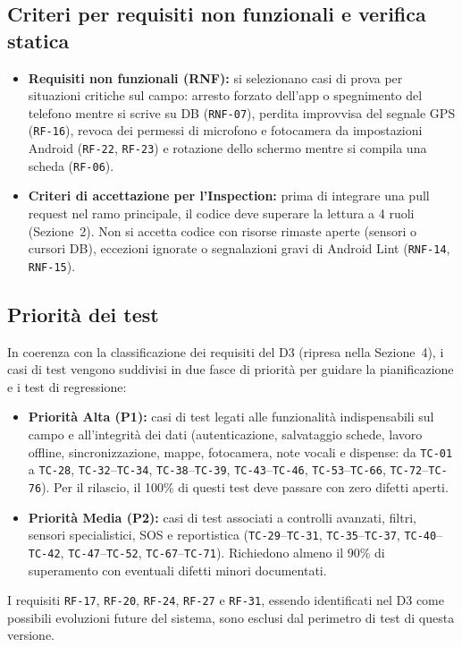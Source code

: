\subsection{Criteri per requisiti non funzionali e verifica statica}
\begin{itemize}
    \item \textbf{Requisiti non funzionali (RNF):} si selezionano casi di prova per situazioni critiche sul campo: arresto forzato dell'app o spegnimento del telefono mentre si scrive su DB (\texttt{RNF-07}), perdita improvvisa del segnale GPS (\texttt{RF-16}), revoca dei permessi di microfono e fotocamera da impostazioni Android (\texttt{RF-22}, \texttt{RF-23}) e rotazione dello schermo mentre si compila una scheda (\texttt{RF-06}).
    \item \textbf{Criteri di accettazione per l'Inspection:} prima di integrare una pull request nel ramo principale, il codice deve superare la lettura a 4 ruoli (Sezione~2). Non si accetta codice con risorse rimaste aperte (sensori o cursori DB), eccezioni ignorate o segnalazioni gravi di Android Lint (\texttt{RNF-14}, \texttt{RNF-15}).
\end{itemize}

\subsection{Priorità dei test}
In coerenza con la classificazione dei requisiti del D3 (ripresa nella Sezione~4), i casi di test vengono suddivisi in due fasce di priorità per guidare la pianificazione e i test di regressione:
\begin{itemize}
    \item \textbf{Priorità Alta (P1):} casi di test legati alle funzionalità indispensabili sul campo e all'integrità dei dati (autenticazione, salvataggio schede, lavoro offline, sincronizzazione, mappe, fotocamera, note vocali e dispense: da \texttt{TC-01} a \texttt{TC-28}, \texttt{TC-32}--\texttt{TC-34}, \texttt{TC-38}--\texttt{TC-39}, \texttt{TC-43}--\texttt{TC-46}, \texttt{TC-53}--\texttt{TC-66}, \texttt{TC-72}--\texttt{TC-76}). Per il rilascio, il 100\% di questi test deve passare con zero difetti aperti.
    \item \textbf{Priorità Media (P2):} casi di test associati a controlli avanzati, filtri, sensori specialistici, SOS e reportistica (\texttt{TC-29}--\texttt{TC-31}, \texttt{TC-35}--\texttt{TC-37}, \texttt{TC-40}--\texttt{TC-42}, \texttt{TC-47}--\texttt{TC-52}, \texttt{TC-67}--\texttt{TC-71}). Richiedono almeno il 90\% di superamento con eventuali difetti minori documentati.
\end{itemize}
I requisiti \texttt{RF-17}, \texttt{RF-20}, \texttt{RF-24}, \texttt{RF-27} e \texttt{RF-31}, essendo identificati nel D3 come possibili evoluzioni future del sistema, sono esclusi dal perimetro di test di questa versione.
